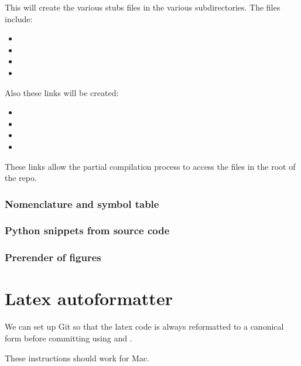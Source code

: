 This will create the various stubs files in the various subdirectories.
The files include:
\begin{itemize}
    \item {}
    \item {}
    \item {}
    \item {}
\end{itemize}
Also these links will be created:
\begin{itemize}
    \item {}
    \item {}
    \item {}
    \item {}
\end{itemize}
These links allow the partial compilation process to access the files in the root of the repo.

\subsubsection{Nomenclature and symbol table}


\subsubsection{Python snippets from source code}


\subsubsection{Prerender of figures}


\section{Latex autoformatter}
\label{sec:latex-autoformatter}

We can set up Git so that the latex code is always reformatted to a canonical form before committing using  and .

These instructions should work for Mac.

